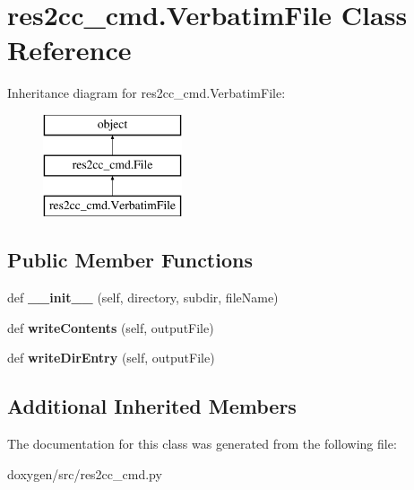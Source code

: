 \hypertarget{classres2cc__cmd_1_1_verbatim_file}{}\section{res2cc\+\_\+cmd.\+Verbatim\+File Class Reference}
\label{classres2cc__cmd_1_1_verbatim_file}
Inheritance diagram for res2cc\+\_\+cmd.\+Verbatim\+File\+:\begin{figure}[H]
\begin{center}
\leavevmode
\includegraphics[height=3.000000cm]{classres2cc__cmd_1_1_verbatim_file}
\end{center}
\end{figure}
\subsection*{Public Member Functions}
\begin{DoxyCompactItemize}
\item 
\mbox{\label{classres2cc__cmd_1_1_verbatim_file_a5df95b75aca6150a28690287f947183c}} 
def {\bfseries \+\_\+\+\_\+init\+\_\+\+\_\+} (self, directory, subdir, file\+Name)
\item 
\mbox{\label{classres2cc__cmd_1_1_verbatim_file_a0cc357aa532c69012b106f82adab23ca}} 
def {\bfseries write\+Contents} (self, output\+File)
\item 
\mbox{\label{classres2cc__cmd_1_1_verbatim_file_a8c360e4f7d93c3b2b3967d98bb086bb8}} 
def {\bfseries write\+Dir\+Entry} (self, output\+File)
\end{DoxyCompactItemize}
\subsection*{Additional Inherited Members}


The documentation for this class was generated from the following file\+:\begin{DoxyCompactItemize}
\item 
doxygen/src/res2cc\+\_\+cmd.\+py\end{DoxyCompactItemize}
